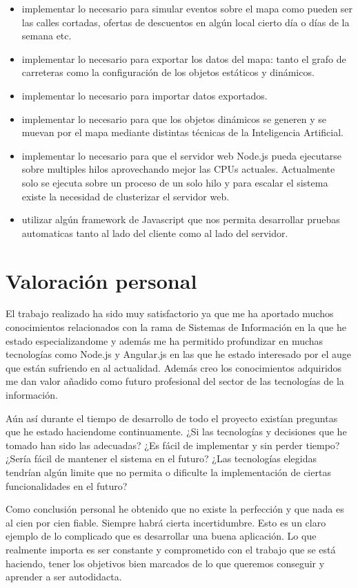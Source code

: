 \begin{itemize}
	\item implementar lo necesario para simular eventos sobre el mapa como pueden ser las calles cortadas, ofertas de descuentos en algún local cierto día o días de la semana etc.
	\item implementar lo necesario para exportar los datos del mapa: tanto el grafo de carreteras como la configuración de los objetos estáticos y dinámicos.
	\item implementar lo necesario para importar datos exportados.
	\item implementar lo necesario para que los objetos dinámicos se generen y se muevan por el mapa mediante distintas técnicas de la Inteligencia Artificial.
	\item implementar lo necesario para que el servidor web Node.js pueda ejecutarse sobre multiples hilos aprovechando mejor las CPUs actuales. Actualmente solo se ejecuta sobre un proceso de un solo hilo y para escalar el sistema existe la necesidad de clusterizar el servidor web.
	\item utilizar algún framework de Javascript que nos permita desarrollar pruebas automaticas tanto al lado del cliente como al lado del servidor.
\end{itemize}

\section{Valoración personal}

El trabajo realizado ha sido muy satisfactorio ya que me ha aportado muchos conocimientos relacionados con la rama de Sistemas de Información en la que he estado especializandome y además me ha permitido profundizar en muchas tecnologías como Node.js y Angular.js en las que he estado interesado por el auge que están sufriendo en al actualidad. Además creo los conocimientos adquiridos me dan valor añadido como futuro profesional del sector de las tecnologías de la información.

Aún así durante el tiempo de desarrollo de todo el proyecto existían preguntas que he estado haciendome continuamente. ¿Si las tecnologías y decisiones que he tomado han sido las adecuadas? ¿Es fácil de implementar y sin perder tiempo? ¿Sería fácil de mantener el sistema en el futuro? ¿Las tecnologías elegidas tendrían algún limite que no permita o dificulte la implementación de ciertas funcionalidades en el futuro? 

Como conclusión personal he obtenido que no existe la perfección y que nada es al cien por cien fiable. Siempre habrá cierta incertidumbre. Esto es un claro ejemplo de lo complicado que es desarrollar una buena aplicación. Lo que realmente importa es ser constante y comprometido con el trabajo que se está haciendo, tener los objetivos bien marcados de lo que queremos conseguir y aprender a ser autodidacta. 